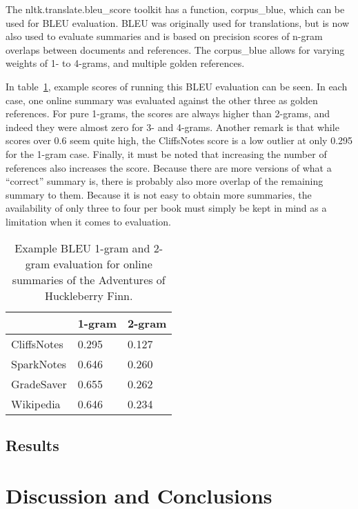 The nltk.translate.bleu\_score toolkit has a function, corpus\_blue, which can
be used for BLEU evaluation. BLEU was originally used for translations, but is
now also used to evaluate summaries and is based on precision scores of
n-gram overlaps between documents and references. The corpus\_blue allows for
varying weights of 1- to 4-grams, and multiple golden references. 

In table~\ref{table:bleu_huckfinn}, example scores of running this BLEU
evaluation can be seen. In each case, one online summary was evaluated against
the other three as golden references. For pure 1-grams, the scores are always
higher than 2-grams, and indeed they were almost zero for 3- and 4-grams.
Another remark is that while scores over 0.6 seem quite high, the CliffsNotes
score is a low outlier at only 0.295 for the 1-gram case. Finally, it must be
noted that increasing the number of references also increases the score.
Because there are more versions of what a ``correct'' summary is, there is
probably also more overlap of the remaining summary to them. Because it is not
easy to obtain more summaries, the availability of only three to four per book
must simply be kept in mind as a limitation when it comes to evaluation.

\begin{table}[H]
	\centering
	\caption{Example BLEU 1-gram and 2-gram evaluation for online summaries of the Adventures of Huckleberry Finn.}\label{table:bleu_huckfinn}
	\begin{tabular}{l l l }
		\toprule
		\textbf{}   & \textbf{1-gram} & \textbf{2-gram} \\ \midrule
		CliffsNotes & 0.295           & 0.127           \\ \midrule
		SparkNotes  & 0.646           & 0.260           \\ \midrule
		GradeSaver  & 0.655           & 0.262           \\ \midrule
		Wikipedia   & 0.646           & 0.234           \\
		\bottomrule
	\end{tabular}
\end{table}

\subsection{Results}


\section{Discussion and Conclusions} %


